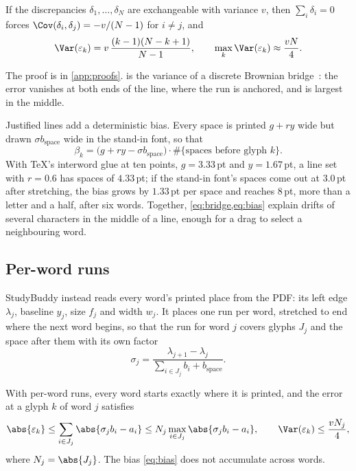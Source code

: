 \begin{theorem}
\label{thm:drift}
If the discrepancies $\delta_1, \dots, \delta_N$ are exchangeable with
variance $v$, then $\sum_i \delta_i = 0$ forces
$\Cov(\delta_i, \delta_j) = -v/(N-1)$ for $i \ne j$, and
\begin{equation}
  \Var(\varepsilon_k) = v\, \frac{(k-1)(N-k+1)}{N-1},
  \qquad
  \max_k \Var(\varepsilon_k) \approx \frac{v N}{4} .
  \label{eq:bridge}
\end{equation}
\end{theorem}

The proof is in \cref{app:proofs}.  is the variance of a
discrete Brownian bridge~\cite{billingsley1999}: the error vanishes at both
ends of the line, where the run is anchored, and is largest in the middle.

Justified lines add a deterministic bias. Every space is printed $g + r y$
wide but drawn $\sigma b_{\text{space}}$ wide in the stand-in font, so that
\begin{equation}
  \beta_k = \bigl(g + r y - \sigma b_{\text{space}}\bigr) \cdot
  \#\{\text{spaces before glyph } k\} .
  \label{eq:bias}
\end{equation}
With \TeX{}'s interword glue at ten points, $g = 3.33$\,pt and $y = 1.67$\,pt,
a line set with $r = 0.6$ has spaces of $4.33$\,pt; if the stand-in font's
spaces come out at $3.0$\,pt after stretching, the bias grows by $1.33$\,pt per
space and reaches $8$\,pt, more than a letter and a half, after six words. Together,
\cref{eq:bridge,eq:bias} explain drifts of several characters in the middle of
a line, enough for a drag to select a neighbouring word.

\subsection{Per-word runs}

StudyBuddy instead reads every word's printed place from the PDF: its left edge
$\lambda_j$, baseline $y_j$, size $f_j$ and width $w_j$. It places one run per
word, stretched to end where the next word begins, so that the run for word
$j$ covers glyphs $J_j$ and the space after them with its own factor
\begin{equation}
  \sigma_j = \frac{\lambda_{j+1} - \lambda_j}
    {\sum_{i \in J_j} b_i + b_{\text{space}}} .
\end{equation}

\begin{theorem}
\label{thm:per-word}
With per-word runs, every word starts exactly where it is printed, and the
error at a glyph $k$ of word $j$ satisfies
\begin{equation}
  \abs{\varepsilon_k} \le \sum_{i \in J_j} \abs{\sigma_j b_i - a_i}
  \le N_j \max_{i \in J_j} \abs{\sigma_j b_i - a_i},
  \qquad
  \Var(\varepsilon_k) \le \frac{v N_j}{4} ,
  \label{eq:per-word}
\end{equation}
where $N_j = \abs{J_j}$. The bias \cref{eq:bias} does not accumulate across
words.
\end{theorem}

